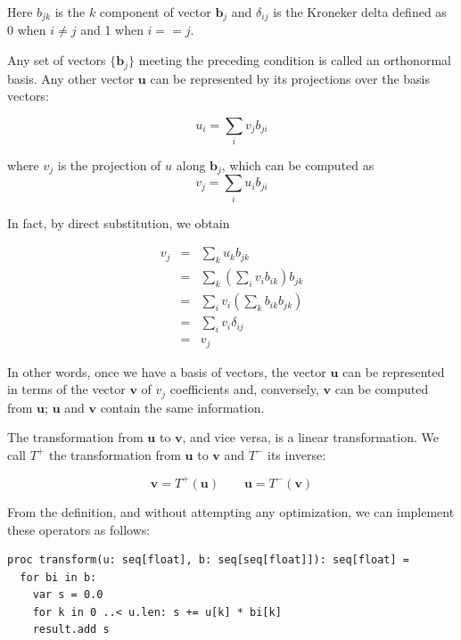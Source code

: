 \documentclass[justified, sixbynine]{tufte-book}
\theoremstyle{plain}%
\newtheorem * {corollary}{Corollary}
\theoremstyle{definition}
\theoremstyle{remark}
\newtheorem * {remark}{Remark}
\newtheorem * {note}{Note}
\begin{document}
\begin{fullwidth}
Here $b_{jk}$ is the $k$ component of vector $\mathbf{b}_j$ and $\delta_{ij}$ is the Kroneker delta defined as 0 when $i\neq j$ and 1 when $i == j$.

Any set of vectors $\{\mathbf{b}_j\}$ meeting the preceding condition is called an orthonormal basis. Any other vector $\mathbf{u}$ can be represented by its projections over the basis vectors:

\begin{equation}
  u_i = \sum_i v_j b_{ji}
\end{equation}

where $v_j$ is the projection of $u$ along $\mathbf{b}_j$, which can be computed as
\begin{equation}
  v_j = \sum_i u_i b_{ji}
\end{equation}

In fact, by direct substitution, we obtain

\begin{eqnarray}
  v_j &=& \sum_k u_k b_{jk} \\
      &=& \sum_k (\sum_i v_i b_{ik}) b_{jk} \\
      &=& \sum_i v_i (\sum_k b_{ik} b_{jk}) \\
      &=& \sum_i v_i \delta_{ij} \\
      &=& v_j
\end{eqnarray}

In other words, once we have a basis of vectors, the vector $\mathbf{u}$ can be represented in terms of the vector $\mathbf{v}$ of $v_j$ coefficients and, conversely, $\mathbf{v}$ can be computed from $\mathbf{u}$; $\mathbf{u}$ and $\mathbf{v}$ contain the same information.

The transformation from $\mathbf{u}$ to $\mathbf{v}$, and vice versa, is a linear transformation. We call $T^+$ the transformation from $\mathbf{u}$ to $\mathbf{v}$  and $T^-$ its inverse:

\begin{equation}
\mathbf{v} = T^+(\mathbf{u}) \qquad
\mathbf{u} = T^-(\mathbf{v})
\end{equation}

From the definition, and without attempting any optimization, we can implement these operators as follows:

\begin{lstlisting}
proc transform(u: seq[float], b: seq[seq[float]]): seq[float] =
  for bi in b:
    var s = 0.0
    for k in 0 ..< u.len: s += u[k] * bi[k]
    result.add s


\end{lstlisting}
\end{fullwidth}
\end{document}
